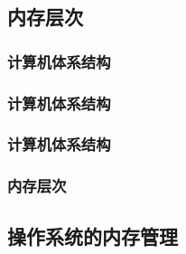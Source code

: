 \subsection{内存层次} %

\begin{frame}[plain,t]
    
    \frametitle{计算机体系结构}
    \begin{figure}
        \centering
    \end{figure}
    
\end{frame}

\begin{frame}[plain,t]
    
    \frametitle{计算机体系结构}
    \begin{figure}
        \centering
    \end{figure}
    
\end{frame}
\begin{frame}[plain,t]
    
    \frametitle{计算机体系结构}
    \begin{figure}
        \centering
    \end{figure}
    
\end{frame}
\begin{frame}[plain,t]
    
    \frametitle{内存层次}
    \begin{figure}
        \centering
    \end{figure}
    
\end{frame}
\subsection{操作系统的内存管理} %

